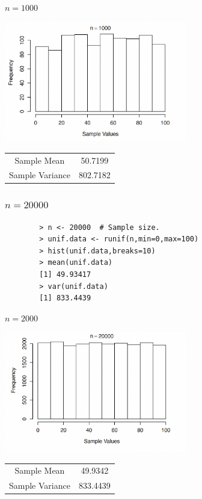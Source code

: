 \documentclass[12pt]{beamer}
\begin{document}
\begin{frame}{$n=1000$}
	
	\centering
	\includegraphics[width=8cm]{histo3.png}
	\begin{tabular}{cc}
		\toprule
		Sample Mean& 50.7199\\
		Sample Variance&802.7182 \\
		\bottomrule
	\end{tabular}
\end{frame}
\begin{frame}[fragile]
	\frametitle{$n = 20000$}

	
	\begin{verbatim}
		> n <- 20000  # Sample size.
		> unif.data <- runif(n,min=0,max=100)
		> hist(unif.data,breaks=10)
		> mean(unif.data)
		[1] 49.93417
		> var(unif.data)
		[1] 833.4439
	\end{verbatim}
	
\end{frame}
\begin{frame}{$n=2000$}
	
	\centering
	\includegraphics[width=8cm]{histo4.png}
	\begin{tabular}{cc}
		\toprule
		Sample Mean& 49.9342\\
		Sample Variance&833.4439 \\
		\bottomrule
	\end{tabular}
\end{frame}
\end{document}
